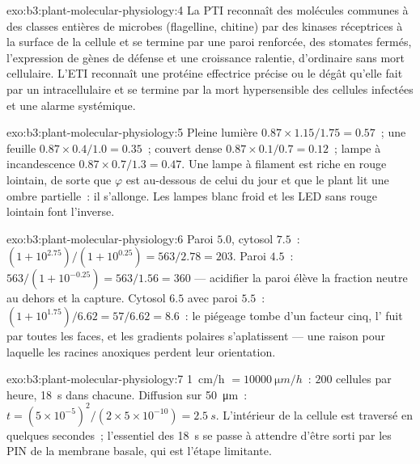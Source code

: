 \begin{solution}{exo:b3:plant-molecular-physiology:4}
La PTI reconnaît des molécules communes à des classes entières de
microbes (flagelline, chitine) par des kinases réceptrices à la surface
de la cellule et se termine par une paroi renforcée, des stomates
fermés, l'expression de gènes de défense et une croissance ralentie,
d'ordinaire sans mort cellulaire. L'ETI reconnaît une protéine
effectrice précise ou le dégât qu'elle fait par un 
intracellulaire et se termine par la mort hypersensible des cellules
infectées et une alarme systémique.
\end{solution}

\begin{solution}{exo:b3:plant-molecular-physiology:5}
Pleine lumière $0.87\times 1.15/1.75 = 0.57$~; une feuille $0.87\times 0.4/1.0 =
0.35$~; couvert dense $0.87\times 0.1/0.7 = 0.12$~; lampe à
incandescence $0.87\times 0.7/1.3 = 0.47$. Une lampe à filament est
riche en rouge lointain, de sorte que $\varphi$ est au-dessous de celui
du jour et que le plant lit une ombre partielle~: il s'allonge. Les
lampes blanc froid et les LED sans rouge lointain font l'inverse.
\end{solution}

\begin{solution}{exo:b3:plant-molecular-physiology:6}
Paroi $5.0$, cytosol $7.5$~: $(1 + 10^{2.75})/(1 + 10^{0.25}) = 563/2.78
= 203$. Paroi $4.5$~: $563/(1 + 10^{-0.25}) = 563/1.56 = 360$ ---
acidifier la paroi élève la fraction neutre au dehors et la capture.
Cytosol $6.5$ avec paroi $5.5$~: $(1 + 10^{1.75})/6.62 = 57/6.62 = 8.6$~:
le piégeage tombe d'un facteur cinq, l' fuit par toutes les faces,
et les gradients polaires s'aplatissent --- une raison pour laquelle les
racines anoxiques perdent leur orientation.
\end{solution}

\begin{solution}{exo:b3:plant-molecular-physiology:7}
\qty{1}{cm/h} $= \qty{10000}{\micro m/h}$~: $200$ cellules par heure,
\qty{18}{s} dans chacune. Diffusion sur \qty{50}{\micro m}~: $t =
(5\times 10^{-5})^{2}/(2\times 5\times 10^{-10}) = \qty{2.5}{s}$.
L'intérieur de la cellule est traversé en quelques secondes~; l'essentiel
des \qty{18}{s} se passe à attendre d'être sorti par les PIN de la
membrane basale, qui est l'étape limitante.
\end{solution}

